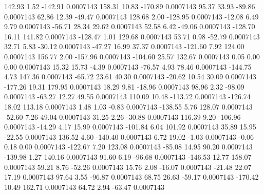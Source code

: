       142.93        1.52     -142.91     0.0007143
      158.31       10.83     -170.89     0.0007143
       95.37       33.93      -89.86     0.0007143
       62.86       12.39      -49.47     0.0007143
      128.68        2.00     -128.95     0.0007143
      -12.08        6.49        9.79     0.0007143
      -56.71       28.34       29.62     0.0007143
       52.58        6.42      -49.06     0.0007143
     -128.70       16.11      141.82     0.0007143
     -128.47        1.01      129.68     0.0007143
       53.71        0.98      -52.79     0.0007143
       32.71        5.83      -30.12     0.0007143
      -47.27       16.99       37.37     0.0007143
     -121.60        7.92      124.00     0.0007143
      156.77        2.00     -157.96     0.0007143
     -104.60       25.57      132.67     0.0007143
        0.05        0.00        0.00     0.0007143
       15.32       15.73       -4.39     0.0007143
      -76.57        4.93       78.46     0.0007143
     -144.75        4.73      147.36     0.0007143
      -65.72       23.61       40.30     0.0007143
      -20.62       10.54       30.09     0.0007143
     -177.26       19.31      179.95     0.0007143
       18.29        9.81      -18.96     0.0007143
       98.96        2.32      -98.09     0.0007143
      -63.27       12.27       49.55     0.0007143
      110.09       10.48     -113.72     0.0007143
     -126.74       18.02      113.18     0.0007143
        1.48        1.03       -0.83     0.0007143
     -138.55        5.76      128.07     0.0007143
      -52.60        7.26       49.04     0.0007143
       31.25        2.26      -30.88     0.0007143
      116.39        9.20     -106.96     0.0007143
      -14.29        4.17       15.99     0.0007143
     -101.84        6.04      101.92     0.0007143
       35.89       15.95      -22.55     0.0007143
      136.52        4.60     -140.40     0.0007143
        6.72       19.02       -1.03     0.0007143
       -0.06        0.18        0.00     0.0007143
     -122.67        7.20      123.08     0.0007143
      -85.08       14.95       90.20     0.0007143
     -139.98        1.27      140.16     0.0007143
       91.60        6.19      -96.68     0.0007143
     -146.53       12.77      158.07     0.0007143
       59.21        8.76      -52.26     0.0007143
       15.76        2.08      -16.07     0.0007143
      -21.48       22.07       17.19     0.0007143
       97.64        3.55      -96.87     0.0007143
       68.75       26.63      -59.17     0.0007143
     -170.42       10.49      162.71     0.0007143
       64.72        2.94      -63.47     0.0007143
